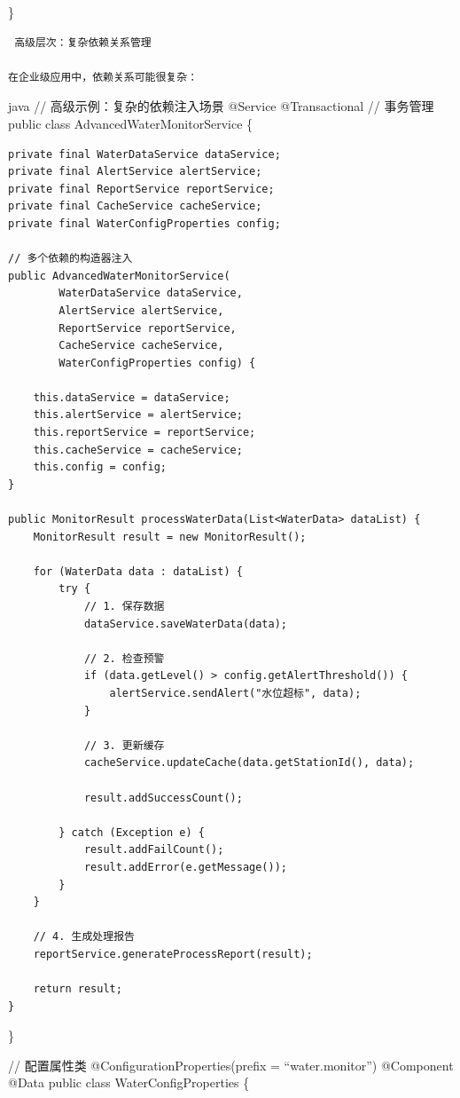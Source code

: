 \}

\begin{lstlisting}
 高级层次：复杂依赖关系管理

在企业级应用中，依赖关系可能很复杂：
\end{lstlisting}

java // 高级示例：复杂的依赖注入场景 @Service @Transactional // 事务管理 public class AdvancedWaterMonitorService \{

\begin{verbatim}
private final WaterDataService dataService;
private final AlertService alertService;
private final ReportService reportService;
private final CacheService cacheService;
private final WaterConfigProperties config;

// 多个依赖的构造器注入
public AdvancedWaterMonitorService(
        WaterDataService dataService,
        AlertService alertService,
        ReportService reportService,
        CacheService cacheService,
        WaterConfigProperties config) {
    
    this.dataService = dataService;
    this.alertService = alertService;
    this.reportService = reportService;
    this.cacheService = cacheService;
    this.config = config;
}

public MonitorResult processWaterData(List<WaterData> dataList) {
    MonitorResult result = new MonitorResult();
    
    for (WaterData data : dataList) {
        try {
            // 1. 保存数据
            dataService.saveWaterData(data);
            
            // 2. 检查预警
            if (data.getLevel() > config.getAlertThreshold()) {
                alertService.sendAlert("水位超标", data);
            }
            
            // 3. 更新缓存
            cacheService.updateCache(data.getStationId(), data);
            
            result.addSuccessCount();
            
        } catch (Exception e) {
            result.addFailCount();
            result.addError(e.getMessage());
        }
    }
    
    // 4. 生成处理报告
    reportService.generateProcessReport(result);
    
    return result;
}
\end{verbatim}

\}

// 配置属性类 @ConfigurationProperties(prefix = ``water.monitor'') @Component @Data public class WaterConfigProperties \{

